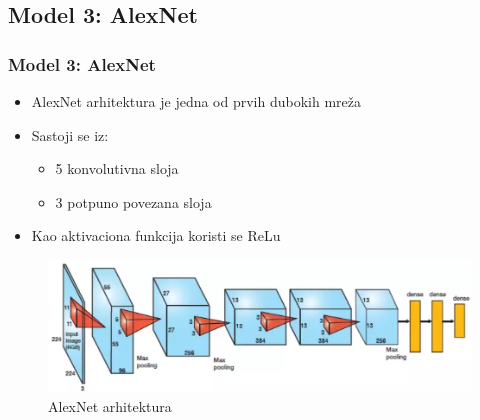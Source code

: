 \documentclass{beamer}
\begin{document}
\subsection{Model 3: AlexNet}
\begin{frame}
\frametitle{Model 3: AlexNet}

\begin{itemize}
\item AlexNet arhitektura je jedna od prvih dubokih mreža
\item Sastoji se iz:
\begin{itemize}
\item 5 konvolutivna sloja
\item 3 potpuno povezana sloja
\end{itemize}
\item Kao aktivaciona funkcija koristi se ReLu
\end{itemize}


\begin{figure}
\includegraphics[scale=0.55]{alexnet_arh.png}
\caption{AlexNet arhitektura}
\end{figure}


\end{frame}
\end{document}
